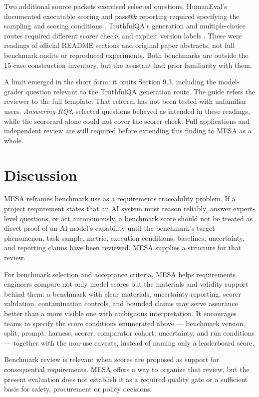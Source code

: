 \documentclass[conference]{IEEEtran}
\begin{document}
    Two additional source packets exercised selected questions. HumanEval's documented executable scoring and pass@$k$ reporting required specifying the sampling and scoring conditions \cite{human_eval_repository}. TruthfulQA's generation and multiple-choice routes required different scorer checks and explicit version labels \cite{truthfulqa_repository}. These were readings of official README sections and original paper abstracts, not full benchmark audits or reproduced experiments. Both benchmarks are outside the 15-case construction inventory, but the assistant had prior familiarity with them.

    A limit emerged in the short form: it omits Section 9.3, including the model-grader question relevant to the TruthfulQA generation route. The guide refers the reviewer to the full template. That referral has not been tested with unfamiliar users. \emph{Answering RQ3}, selected questions behaved as intended in these readings, while the scorecard alone could not cover the scorer check. Full applications and independent review are still required before extending this finding to MESA as a whole.

\section{Discussion}

    MESA reframes benchmark use as a requirements traceability problem. If a project requirement states that an AI system must reason reliably, answer expert-level questions, or act autonomously, a benchmark score should not be treated as direct proof of an AI model's capability until the benchmark's target phenomenon, task sample, metric, execution conditions, baselines, uncertainty, and reporting claims have been reviewed. MESA supplies a structure for that review.
    
    For benchmark selection and acceptance criteria, MESA helps requirements engineers compare not only model scores but the materials and validity support behind them: a benchmark with clear materials, uncertainty reporting, scorer validation, contamination controls, and bounded claims may serve assurance better than a more visible one with ambiguous interpretation. It encourages teams to specify the score conditions enumerated above --- benchmark version, split, prompt, harness, scorer, comparator cohort, uncertainty, and run conditions --- together with the non-use caveats, instead of naming only a leaderboard score.
    
    Benchmark review is relevant when scores are proposed as support for consequential requirements. MESA offers a way to organize that review, but the present evaluation does not establish it as a required quality gate or a sufficient basis for safety, procurement or policy decisions.
    
\end{document}
